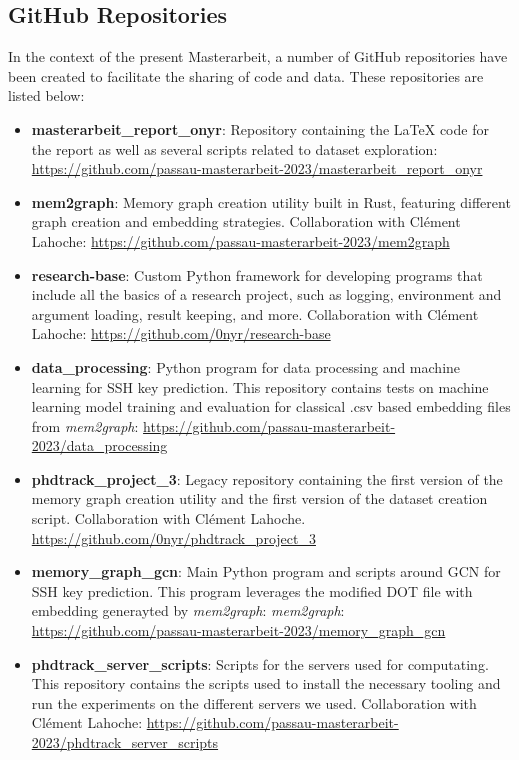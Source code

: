 	\subsection{GitHub Repositories}

	In the context of the present Masterarbeit, a number of GitHub repositories have been created to facilitate the sharing of code and data. These repositories are listed below:

	\begin{itemize}

		\item \textbf{masterarbeit\_report\_onyr}: Repository containing the LaTeX code for the report as well as several scripts related to dataset exploration: \url{https://github.com/passau-masterarbeit-2023/masterarbeit_report_onyr}
		
		\item \textbf{mem2graph}: Memory graph creation utility built in Rust, featuring different graph creation and embedding strategies. Collaboration with Clément Lahoche: \url{https://github.com/passau-masterarbeit-2023/mem2graph}

		\item \textbf{research-base}: Custom Python framework for developing programs that include all the basics of a research project, such as logging, environment and argument loading, result keeping, and more. Collaboration with Clément Lahoche: \url{https://github.com/0nyr/research-base}

		\item \textbf{data\_processing}: Python program for data processing and machine learning for SSH key prediction. This repository contains tests on machine learning model training and evaluation for classical .csv based embedding files from \textit{mem2graph}: \url{https://github.com/passau-masterarbeit-2023/data_processing}
		
		\item \textbf{phdtrack\_project\_3}: Legacy repository containing the first version of the memory graph creation utility and the first version of the dataset creation script. Collaboration with Clément Lahoche. \url{https://github.com/0nyr/phdtrack_project_3}
		
		\item \textbf{memory\_graph\_gcn}: Main Python program and scripts around GCN for SSH key prediction. This program leverages the modified DOT file with embedding generayted by \textit{mem2graph}: \textit{mem2graph}:
		\url{https://github.com/passau-masterarbeit-2023/memory_graph_gcn}

		\item \textbf{phdtrack\_server\_scripts}: Scripts for the servers used for computating. This repository contains the scripts used to install the necessary tooling and run the experiments on the different servers we used. Collaboration with Clément Lahoche:
		\url{https://github.com/passau-masterarbeit-2023/phdtrack_server_scripts}
	\end{itemize}

